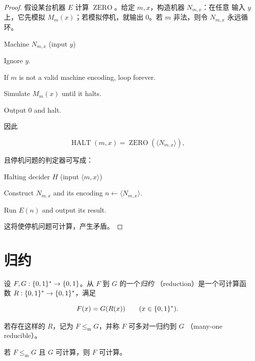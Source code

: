 \begin{proof}
  假设某台机器 $E$ 计算 $\operatorname{ZERO}$。给定 $m,x$，构造机器
  $N_{m,x}$：在任意
  输入 $y$ 上，它先模拟 $M_m(x)$；若模拟停机，就输出 $0$。若 $m$ 非法，则令
  $N_{m,x}$ 永远循环。

  \begin{pseudocode}{Machine $N_{m,x}$ (input $y$)}
    \item Ignore $y$.
    \item If $m$ is not a valid machine encoding, loop forever.
    \item Simulate $M_m(x)$ until it halts.
    \item Output $0$ and halt.
  \end{pseudocode}

  因此

  \[
    \operatorname{HALT}(m,x)
      =\operatorname{ZERO}(\langle N_{m,x}\rangle),
  \]

  且停机问题的判定器可写成：

  \begin{pseudocode}{Halting decider $H$ (input $\langle m,x\rangle$)}
    \item Construct $N_{m,x}$ and its encoding $n\gets\langle N_{m,x}\rangle$.
    \item Run $E(n)$ and output its result.
  \end{pseudocode}

  这将使停机问题可计算，产生矛盾。
\end{proof}

\section{归约}

\begin{definition}[归约]
  \label{def:computable-reduction}
  设 $F,G:\{0,1\}^{*}\to\{0,1\}$。从 $F$ 到 $G$ 的一个\emph{归约}
  （reduction）是一个可计算函数 $R:\{0,1\}^{*}\to\{0,1\}^{*}$，满足

  \[
    F(x)=G(R(x))
    \qquad(x\in\{0,1\}^{*}).
  \]

  若存在这样的 $R$，记为 $F\leq_{\mathrm m}G$，并称 $F$ 可多对一归约到 $G$
  （many-one reducible）。
\end{definition}

\begin{corollary}
  \label{cor:reduction-preserves-computability}
  若 $F\leq_{\mathrm m}G$ 且 $G$ 可计算，则 $F$ 可计算。
\end{corollary}

